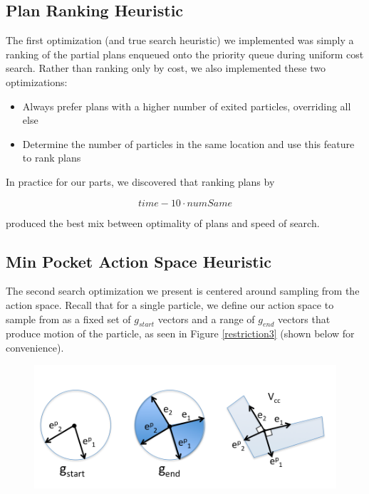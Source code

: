 \subsection{Plan Ranking Heuristic}

The first optimization (and true search heuristic) we implemented was simply a ranking of the partial plans enqueued onto the priority queue during uniform cost search. Rather than ranking only by cost, we also implemented these two optimizations:

\begin{itemize}
\item Always prefer plans with a higher number of exited particles, overriding all else
\item Determine the number of particles in the same location and use this feature to rank plans
\end{itemize}

In practice for our parts, we discovered that ranking plans by

$$
time - 10 \cdot numSame
$$

produced the best mix between optimality of plans and speed of search.

\subsection{Min Pocket Action Space Heuristic}

The second search optimization we present is centered around sampling from the action space. Recall that for a single particle, we define our action space to sample from as a fixed set of $g_{start}$ vectors and a range of $g_{end}$ vectors that produce motion of the particle, as seen in Figure \ref{restriction3} (shown below for convenience).

\begin{figure}[H]
  \centering
    \includegraphics[width=\0.8\linewidth]{figures/restriction3/figure.png}
\end{figure}




